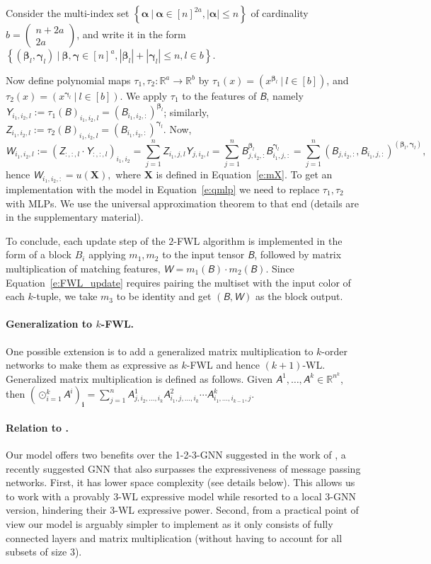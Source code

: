 \documentclass{article}
\newcommand{\abs}[1]{\left\vert#1\right\vert}
\newcommand{\set}[1]{\left\{#1\right\}}
\newcommand{\Real}{\mathbb R}
\newcommand{\too}{\rightarrow}
\newcommand{\revision}[1]{{\color{black} #1}}
\def\Eqref#1{Equation~\ref{#1}}
\def\vi{{\bm{i}}}
\def\valpha{{\bm{\alpha}}}
\def\vbeta{{\bm{\beta}}}
\def\vgamma{{\bm{\gamma}}}
\def\mX{{\bm{X}}}
\newcommand{\tens}[1]{\bm{\mathsfit{#1}}}
\def\tA{{\tens{A}}}
\def\tB{{\tens{B}}}
\def\tW{{\tens{W}}}
\def\tY{{\tens{Y}}}
\def\tZ{{\tens{Z}}}
\begin{document}
Consider the multi-index set $\set{\valpha \ \vert \ \valpha\in [n]^{2a},  \abs{\valpha}\leq n}$ of cardinality $b=\left(\begin{smallmatrix}n+2a\\ 2a\end{smallmatrix}\right)$, and write it in the form $\set{(\vbeta_l,\vgamma_l) \ \vert \ \vbeta,\vgamma\in [n]^a , \abs{\vbeta_l}+\abs{\vgamma_l} \leq n, l\in b}$. 

Now define polynomial maps $\tau_1,\tau_2 : \Real^a \too \Real^b$ by $\tau_1(x)=(x^{\vbeta_l} \ \vert \ l\in [b])$, and $\tau_2(x)=(x^{\vgamma_l}\ \vert \ l\in [b])$. We apply $\tau_1$ to the features of $\tB$, namely $\tY_{i_1,i_2,l}:=\tau_1(\tB)_{i_1,i_2,l}=(\tB_{i_1,i_2,:})^{\vbeta_l}$; similarly, $\tZ_{i_1,i_2,l}:=\tau_2(\tB)_{i_1,i_2,l}=(\tB_{i_1,i_2,:})^{\vgamma_l}$. Now,
$$\tW_{i_1,i_2,l}:=(\tZ_{:,:,l} \cdot \tY_{:,:,l})_{i_1,i_2} = \sum_{j=1}^n \tZ_{i_1,j,l} \tY_{j,i_2, l} = 
\sum_{j=1}^n \tB_{j,i_2,:}^{\vbeta_l} \tB_{i_1,j,:}^{\vgamma_l}=
\sum_{j=1}^n (\tB_{j,i_2,:},\tB_{i_1,j,:})^{(\vbeta_l,\vgamma_l)},$$
hence
$\tW_{i_1,i_2,:} = u(\mX),$ 
where $\mX$ is defined in \Eqref{e:mX}. To get an implementation with the  model in \Eqref{e:qmlp} we need to replace $\tau_1,\tau_2$ with MLPs. We use the universal approximation theorem to that end (details are in the supplementary material). 

To conclude, each update step of the $2$-FWL algorithm is implemented in the form of a block $B_i$ applying $m_1,m_2$ to the input tensor $\tB$, followed by matrix multiplication of matching features, $\tW = m_1(\tB)\cdot m_2(\tB)$. Since \Eqref{e:FWL_update} requires pairing the multiset with the input color of each $k$-tuple, we take $m_3$ to be identity and get $(\tB,\tW)$ as the block output. 

\paragraph{Generalization to $k$-FWL.} One possible extension is to add a generalized matrix multiplication to $k$-order networks to make them as expressive as $k$-FWL and hence $(k+1)$-WL. Generalized matrix multiplication is defined as follows. Given $\tA^1,\ldots,\tA^k\in\Real^{n^k}$, then $(\odot_{i=1}^k \tA^i)_{\vi} = \sum_{j=1}^n \tA^1_{j,i_2,\ldots,i_k}\tA^2_{i_1,j,\ldots,i_k}\cdots \tA^k_{i_1,\ldots,i_{k-1},j}$.


\revision{\paragraph{Relation to \citep{morris2018weisfeiler}.} Our model offers two benefits over the 1-2-3-GNN suggested in the work of \cite{morris2018weisfeiler}, a recently suggested GNN that also surpasses the expressiveness of message passing networks. First, it has lower space complexity (see details below). This allows us to work with a provably 3-WL expressive model while \cite{morris2018weisfeiler} resorted to a local 3-GNN version, hindering their 3-WL expressive power. Second, from a practical point of view our model is arguably simpler to implement as it only consists of fully connected layers and matrix multiplication (without having to account for all subsets of size 3). }
\end{document}
